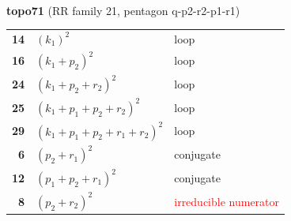 \documentclass[10pt]{article}
\begin{document}
\begin{minipage}[t]{0.48\textwidth}
{}\\[2mm]\textbf{topo71} (RR family 21, pentagon q-p2-r2-p1-r1)\\[2pt]{\footnotesize\begin{tabular}{@{}r@{\ \ }l@{\ \ }l@{}}\textbf{14} & $(k_1)^2$ & loop\\
\textbf{16} & $(k_1+p_2)^2$ & loop\\
\textbf{24} & $(k_1+p_2+r_2)^2$ & loop\\
\textbf{25} & $(k_1+p_1+p_2+r_2)^2$ & loop\\
\textbf{29} & $(k_1+p_1+p_2+r_1+r_2)^2$ & loop\\
\textbf{6} & $(p_2+r_1)^2$ & conjugate\\
\textbf{12} & $(p_1+p_2+r_1)^2$ & conjugate\\
\textbf{8} & $(p_2+r_2)^2$ & \textcolor{red}{irreducible numerator}\\\end{tabular}}\end{minipage}\hfill%
\end{document}
